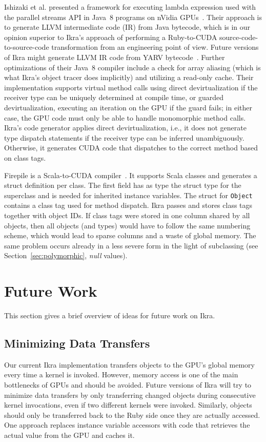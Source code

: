 \documentclass[preprint]{sigplanconf}
\begin{document}
Ishizaki et al. presented a framework for executing lambda expression used with the parallel streams API in Java~8 programs on nVidia GPUs~\cite{ishizaki2015compiling}. Their approach is to generate LLVM intermediate code (IR) from Java bytecode, which is in our opinion superior to Ikra's approach of performing a Ruby-to-CUDA source-code-to-source-code transformation from an engineering point of view. Future versions of Ikra might generate LLVM IR code from YARV bytecode~\cite{Sasada:2005:YYR:1094855.1094912}. Further optimizations of their Java~8 compiler include a check for array aliasing (which is what Ikra's object tracer does implicitly) and utilizing a read-only cache. Their implementation supports virtual method calls using direct devirtualization if the receiver type can be uniquely determined at compile time, or guarded devirtualization, executing an iteration on the GPU if the guard fails; in either case, the GPU code must only be able to handle monomorphic method calls. Ikra's code generator applies direct devirtualization, i.e., it does not generate type dispatch statements if the receiver type can be inferred unambiguously. Otherwise, it generates CUDA code that dispatches to the correct method based on class tags.

Firepile is a Scala-to-CUDA compiler~\cite{Nystrom:2011:FRC:2047862.2047883}. It supports Scala classes and generates a struct definition per class. The first field has as type the struct type for the superclass and is needed for inherited instance variables. The struct for \texttt{Object} contains a class tag used for method dispatch. Ikra passes and stores class tags together with object IDs. If class tags were stored in one column shared by all objects, then all objects (and types) would have to follow the same numbering scheme, which would lead to sparse columns and a waste of global memory. The same problem occurs already in a less severe form in the light of subclassing (see Section~\ref{sec:polymorphic}, \emph{null} values).

\section{Future Work}
This section gives a brief overview of ideas for future work on Ikra.

\subsection{Minimizing Data Transfers}
\label{sec:minimizing_dtr}
Our current Ikra implementation transfers objects to the GPU's global memory every time a kernel is invoked. However, memory access is one of the main bottlenecks of GPUs and should be avoided. Future versions of Ikra will try to minimize data transfers by only transferring changed objects during consecutive kernel invocations, even if two different kernels were invoked. Similarly, objects should only be transferred back to the Ruby side once they are actually accessed. One approach replaces instance variable accessors with code that retrieves the actual value from the GPU and caches it.
\end{document}
